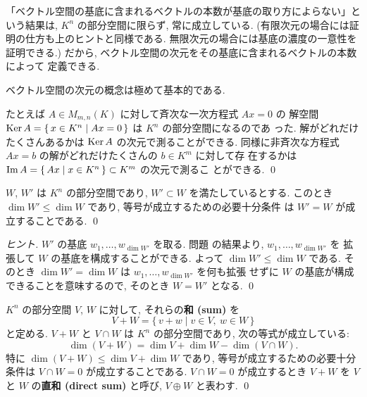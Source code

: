 \documentclass[12pt,twoside]{jarticle}
\begin{document}
\begin{guide}
  「ベクトル空間の基底に含まれるベクトルの本数が基底の取り方によらない」と
  いう結果は, $K^n$ の部分空間に限らず, 常に成立している.
  (有限次元の場合には証明の仕方も上のヒントと同様である.
  無限次元の場合には基底の濃度の一意性を証明できる.)
  だから, ベクトル空間の次元をその基底に含まれるベクトルの本数によって
  定義できる.  

  ベクトル空間の次元の概念は極めて基本的である. 

  たとえば $A\in M_{m,n}(K)$ に対して斉次な一次方程式 $Ax=0$ の
  解空間 $\mathop{\mathrm{Ker}}\nolimits A=\{\,x\in K^n\mid Ax=0\,\}$ は $K^n$ の部分空間になるのであ
  った.  解がどれだけたくさんあるかは $\mathop{\mathrm{Ker}}\nolimits A$ の次元で測ることができる.
  同様に非斉次な方程式 $Ax=b$ の解がどれだけたくさんの $b\in K^m$ に対して存
  在するかは $\mathop{\mathrm{Im}}\nolimits A = \{\,Ax\mid x\in K^n\,\}\subset K^m$ の次元で測るこ
  とができる.
  \qed
\end{guide}


\begin{question}
  \label{q:W'-W}
  $W$, $W'$ は $K^n$ の部分空間であり, $W'\subset W$ を満たしているとする.
  このとき $\dim W'\le \dim W$ であり, 等号が成立するための必要十分条件
  は $W'=W$ が成立することである. \qed
\end{question}

\begin{proof}[ヒント]
  $W'$ の基底 $w_1,\ldots,w_{\dim W'}$ を取る.
  問題  の結果より, $w_1,\ldots,w_{\dim W'}$ を
  拡張して $W$ の基底を構成することができる. 
  よって $\dim W'\le\dim W$ である.
  そのとき $\dim W'=\dim W$ は $w_1,\ldots,w_{\dim W'}$ を何も拡張
  せずに $W$ の基底が構成できることを意味するので, そのとき $W=W'$ となる.
  \qed
\end{proof}


\begin{question}[2つの部分空間の和と直和]
  \label{q:dim(V+W)}
  $K^n$ の部分空間 $V$, $W$ に対して, それらの{\bf 和 (sum)} を
  \begin{equation*}
    V+W = \{\, v + w \mid v\in V,\ w\in W \,\}
  \end{equation*}
  と定める. $V+W$ と $V\cap W$ は $K^n$ の部分空間であり, 
  次の等式が成立している:
  \begin{equation*}
    \dim(V+W) = \dim V + \dim W - \dim(V\cap W).
  \end{equation*}
  特に $\dim(V+W)\le\dim V+\dim W$ であり, 
  等号が成立するための必要十分条件は $V\cap W=0$ が成立することである.
  $V\cap W=0$ が成立するとき $V+W$ を $V$ と $W$ の{\bf 直和 (direct sum)} 
  と呼び, $V\oplus W$ と表わす.
  \qed
\end{question}
\end{document}

